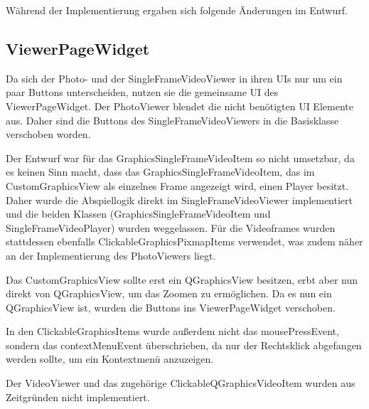Während der Implementierung ergaben sich folgende Änderungen im Entwurf.

\subsection{ViewerPageWidget}
Da sich der Photo- und der SingleFrameVideoViewer in ihren UIs nur um ein paar Buttons unterscheiden, nutzen sie die gemeinsame UI des ViewerPageWidget. Der PhotoViewer blendet die nicht benötigten UI Elemente aus. Daher sind die Buttons des SingleFrameVideoViewers in die Basisklasse verschoben worden.

Der Entwurf war für das GraphicsSingleFrameVideoItem so nicht umsetzbar, da es keinen Sinn macht, dass das GraphicsSingleFrameVideoItem, das im CustomGraphicsView als einzelnes Frame angezeigt wird, einen Player besitzt. Daher wurde die Abspiellogik direkt im SingleFrameVideoViewer implementiert und die beiden Klassen (GraphicsSingleFrameVideoItem und SingleFrameVideoPlayer) wurden weggelassen. Für die Videoframes wurden stattdessen ebenfalls ClickableGraphicsPixmapItems verwendet, was zudem näher an der Implementierung des PhotoViewers liegt.

Das CustomGraphicsView sollte erst ein QGraphicsView besitzen, erbt aber nun direkt von QGraphicsView, um das Zoomen zu ermöglichen. Da es nun ein QGraphicsView ist, wurden die Buttons ins ViewerPageWidget verschoben.

In den ClickableGraphicsItems wurde außerdem nicht das mousePressEvent, sondern das contextMenuEvent überschrieben, da nur der Rechtsklick abgefangen werden sollte, um ein Kontextmenü anzuzeigen.

Der VideoViewer und das zugehörige ClickableQGraphicsVideoItem wurden aus Zeitgründen nicht implementiert.
